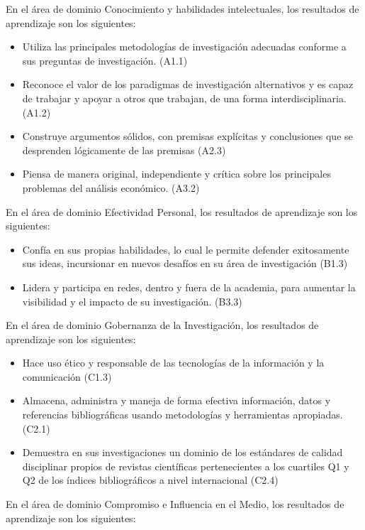 En el área de dominio Conocimiento y habilidades intelectuales, los resultados de aprendizaje son los siguientes:
\begin{itemize}
\item 	Utiliza las principales metodologías de investigación adecuadas conforme a sus preguntas de investigación. (A1.1)
\item 	Reconoce el valor de los paradigmas de investigación alternativos y es capaz de trabajar y apoyar a otros que trabajan, de una forma interdisciplinaria. (A1.2)
\item 	Construye argumentos sólidos, con premisas explícitas y conclusiones que se desprenden lógicamente de las premisas (A2.3)
\item 	Piensa de manera original, independiente y crítica sobre los principales problemas del análisis económico. (A3.2)
\end{itemize}
En el área de dominio Efectividad Personal, los resultados de aprendizaje son los siguientes:
\begin{itemize}
\item 	Confía en sus propias habilidades, lo cual le permite defender exitosamente sus ideas, incursionar en nuevos desafíos en su área de investigación (B1.3)
\item 	Lidera y participa en redes, dentro y fuera de la academia, para aumentar la visibilidad y el impacto de su investigación. (B3.3)
\end{itemize}
En el área de dominio Gobernanza de la Investigación, los resultados de aprendizaje son los siguientes:
\begin{itemize}
\item 	Hace uso ético y responsable de las tecnologías de la información y la comunicación (C1.3)
\item 	Almacena, administra y maneja de forma efectiva información, datos y referencias bibliográficas usando metodologías y herramientas apropiadas. (C2.1)
\item 	Demuestra en sus investigaciones un dominio de los estándares de calidad disciplinar propios de revistas científicas pertenecientes a los cuartiles Q1 y Q2 de los índices bibliográficos a nivel internacional (C2.4)
\end{itemize}
En el área de dominio Compromiso e Influencia en el Medio, los resultados de aprendizaje son los siguientes:
